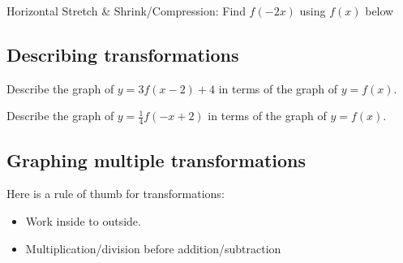 \begin{example}
Horizontal Stretch \& Shrink/Compression:
Find $f(-2x)$ using $f(x)$ below
\end{example}
\ifprintanswers
\else
\begin{center}
\end{center}
\fi

\subsection{Describing transformations}

\begin{exercise}
Describe the graph of $y=3f(x-2)+4$ in terms of the graph
of $y=f(x)$.
\end{exercise}
\begin{solution}[1in]

\end{solution}

\begin{exercise}
Describe the graph of $y=\frac{1}{4}f(-x+2)$ in terms of the graph
of $y=f(x)$.
\end{exercise}
\begin{solution}[1in]

\end{solution}

\subsection{Graphing multiple transformations}

\begin{note}
Here is a rule of thumb for transformations:
\begin{itemize}
    \item Work inside to outside.
    \item Multiplication/division before addition/subtraction
\end{itemize}
\end{note}

